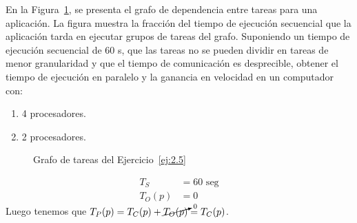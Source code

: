 \begin{ejercicio}\label{ej:2.5}
    
    En la Figura~\ref{fig:Grafo_2.5}, se presenta el grafo de dependencia entre tareas para una aplicación.
    La figura muestra la fracción del tiempo de ejecución secuencial que la aplicación tarda en ejecutar grupos de tareas del grafo.
    Suponiendo un tiempo de ejecución secuencial de 60 s, que las tareas no se pueden dividir en tareas de menor granularidad y
    que el tiempo de comunicación es desprecible, obtener el tiempo de ejecución en paralelo y la ganancia en velocidad en un computador con:
    \begin{enumerate}
        \item 4 procesadores.
        \item 2 procesadores.
    \end{enumerate}
    \begin{figure}
        \centering
        \caption{Grafo de tareas del Ejercicio~\ref{ej:2.5}}
        \label{fig:Grafo_2.5}
    \end{figure}

    \begin{align*}
        T_S &= 60 \text{\ seg} \\
        T_O(p) &= 0
    \end{align*}
    Luego tenemos que $T_P(p) = T_C(p) + \cancelto{0}{T_O(p)} = T_C(p)$.


\end{ejercicio}

